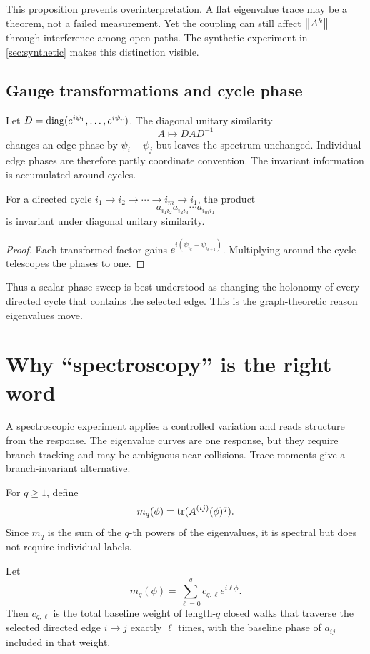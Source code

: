 This proposition prevents overinterpretation.  A flat eigenvalue trace may be a theorem, not a failed measurement.  Yet the coupling can still affect \(\left\lVert A^k\right\rVert\) through interference among open paths.  The synthetic experiment in \cref{sec:synthetic} makes this distinction visible.

\subsection{Gauge transformations and cycle phase}

Let \(D=\operatorname{diag}(e^{i\psi_1},\ldots,e^{i\psi_r})\).  The diagonal unitary similarity
\[
A\mapsto DAD^{-1}
\]
changes an edge phase by \(\psi_i-\psi_j\) but leaves the spectrum unchanged.  Individual edge phases are therefore partly coordinate convention.  The invariant information is accumulated around cycles.

\begin{proposition}
For a directed cycle \(i_1\to i_2\to\cdots\to i_m\to i_1\), the product
\[
a_{i_1i_2}a_{i_2i_3}\cdots a_{i_mi_1}
\]
is invariant under diagonal unitary similarity.
\end{proposition}

\begin{proof}
Each transformed factor gains \(e^{i(\psi_{i_k}-\psi_{i_{k+1}})}\).  Multiplying around the cycle telescopes the phases to one.
\end{proof}

Thus a scalar phase sweep is best understood as changing the holonomy of every directed cycle that contains the selected edge.  This is the graph-theoretic reason eigenvalues move.

\section{Why ``spectroscopy'' is the right word}

A spectroscopic experiment applies a controlled variation and reads structure from the response.  The eigenvalue curves are one response, but they require branch tracking and may be ambiguous near collisions.  Trace moments give a branch-invariant alternative.

For \(q\geq1\), define
\[
m_q(\phi)=\operatorname{tr}(A^{(ij)}(\phi)^q).
\]
Since \(m_q\) is the sum of the \(q\)-th powers of the eigenvalues, it is spectral but does not require individual labels.

\begin{theorem}
Let
\[
m_q(\phi)=\sum_{\ell=0}^{q}c_{q,\ell}e^{i\ell\phi}.
\]
Then \(c_{q,\ell}\) is the total baseline weight of length-\(q\) closed walks that traverse the selected directed edge \(i\to j\) exactly \(\ell\) times, with the baseline phase of \(a_{ij}\) included in that weight.
\end{theorem}


